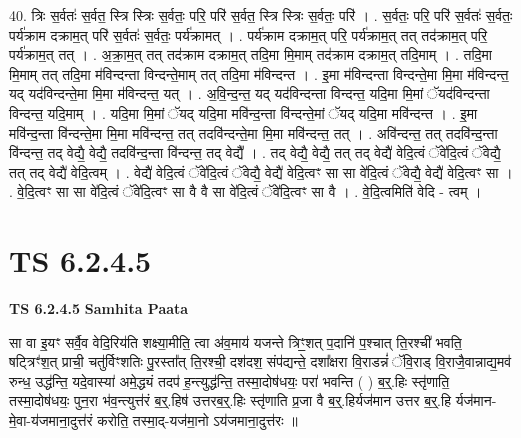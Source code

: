 \documentclass[17pt]{extarticle}
\begin{document}
40. त्रिः स॒र्वतः॑ स॒र्वत॒ स्त्रि स्त्रिः स॒र्वतः॒ परि॒ परि॑ स॒र्वत॒ स्त्रि स्त्रिः स॒र्वतः॒ परि॑ । . स॒र्वतः॒ परि॒ परि॑ स॒र्वतः॑ स॒र्वतः॒ पर्य॑क्राम दक्राम॒त् परि॑ स॒र्वतः॑ स॒र्वतः॒ पर्य॑क्रामत् । . पर्य॑क्राम दक्राम॒त् परि॒ पर्य॑क्राम॒त् तत् तद॑क्राम॒त् परि॒ पर्य॑क्राम॒त् तत् । . अ॒क्रा॒म॒त् तत् तद॑क्राम दक्राम॒त् तदि॒मा मि॒माम् तद॑क्राम दक्राम॒त् तदि॒माम् । . तदि॒मा मि॒माम् तत् तदि॒मा म॑विन्दन्ता विन्दन्ते॒माम् तत् तदि॒मा म॑विन्दन्त । . इ॒मा म॑विन्दन्ता विन्दन्ते॒मा मि॒मा म॑विन्दन्त॒ यद् यद॑विन्दन्ते॒मा मि॒मा म॑विन्दन्त॒ यत् । . अ॒वि॒न्द॒न्त॒ यद् यद॑विन्दन्ता विन्दन्त॒ यदि॒मा मि॒मां ॅयद॑विन्दन्ता विन्दन्त॒ यदि॒माम् । . यदि॒मा मि॒मां ॅयद् यदि॒मा मवि॑न्द॒न्ता वि॑न्दन्ते॒मां ॅयद् यदि॒मा मवि॑न्दन्त । . इ॒मा मवि॑न्द॒न्ता वि॑न्दन्ते॒मा मि॒मा मवि॑न्दन्त॒ तत् तदवि॑न्दन्ते॒मा मि॒मा मवि॑न्दन्त॒ तत् । . अवि॑न्दन्त॒ तत् तदवि॑न्द॒न्ता वि॑न्दन्त॒ तद् वेद्यै॒ वेद्यै॒ तदवि॑न्द॒न्ता वि॑न्दन्त॒ तद् वेद्यै᳚ । . तद् वेद्यै॒ वेद्यै॒ तत् तद् वेद्यै॑ वेदि॒त्वं ॅवे॑दि॒त्वं ॅवेद्यै॒ तत् तद् वेद्यै॑ वेदि॒त्वम् । . वेद्यै॑ वेदि॒त्वं ॅवे॑दि॒त्वं ॅवेद्यै॒ वेद्यै॑ वेदि॒त्वꣳ सा सा वे॑दि॒त्वं ॅवेद्यै॒ वेद्यै॑ वेदि॒त्वꣳ सा । . वे॒दि॒त्वꣳ सा सा वे॑दि॒त्वं ॅवे॑दि॒त्वꣳ सा वै वै सा वे॑दि॒त्वं ॅवे॑दि॒त्वꣳ सा वै । . वे॒दि॒त्वमिति॑ वेदि - त्वम् । \newline
\pagebreak
{}

\section{ TS 6.2.4.5 }

\textbf{TS 6.2.4.5 } \newline
\textbf{Samhita Paata} \newline

सा वा इ॒यꣳ सर्वै॒व वेदि॒रिय॑ति शक्ष्या॒मीति॒ त्वा अ॑व॒माय॑ यजन्ते त्रिꣳ॒॒शत् प॒दानि॑ प॒श्चात् ति॒रश्ची॑ भवति॒ षट्त्रिꣳ॑श॒त् प्राची॒ चतु॑र्विꣳशतिः पु॒रस्ता᳚त् ति॒रश्ची॒ दश॑दश॒ संप॑द्यन्ते॒ दशा᳚क्षरा वि॒राडन्नं॑ ॅवि॒राड् वि॒राजै॒वान्नाद्य॒मव॑ रुन्ध॒ उद्ध॑न्ति॒ यदे॒वास्या॑ अमे॒द्ध्यं तदप॑ ह॒न्त्युद्ध॑न्ति॒ तस्मा॒दोष॑धयः॒ परा॑ भवन्ति ( ) ब॒र्॒.हिः स्तृ॑णाति॒ तस्मा॒दोष॑धयः॒ पुन॒रा भ॑व॒न्त्युत्त॑रं ब॒र्॒.हिष॑ उत्तरब॒र्॒.हिः स्तृ॑णाति प्र॒जा वै ब॒र्॒.हिर्यज॑मान उत्तर ब॒र्॒.हि र्यज॑मान-मे॒वा-य॑जमाना॒दुत्त॑रं करोति॒ तस्मा॒द्-यज॑मा॒नो ऽय॑जमाना॒दुत्त॑रः ॥ \newline
\end{document}
